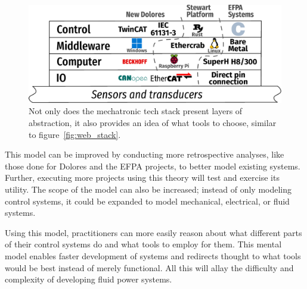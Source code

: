 \documentclass[english,12pt,a4paper,pdftex,eng,utf8]{aaltothesis}
\begin{document}
\begin{figure}[h]
  \centering
  \includegraphics[width=\textwidth]{assets/mechatronic_tech_stack_filled}
  \caption{Not only does the mechatronic tech stack present layers of abstraction, it also provides an idea of what tools to choose, similar to figure~\ref{fig:web_stack}.}\label{fig:mechatronic_tech_stack_filled}
\end{figure}

This model can be improved by conducting more retrospective analyses, like those done for Dolores and the EFPA projects, to better model existing systems. Further, executing more projects using this theory will test and exercise its utility. The scope of the model can also be increased; instead of only modeling control systems, it could be expanded to model mechanical, electrical, or fluid systems.

Using this model, practitioners can more easily reason about what different parts of their control systems do and what tools to employ for them. This mental model enables faster development of systems and redirects thought to what tools would be best instead of merely functional. All this will allay the difficulty and complexity of developing fluid power systems.

\clearpage

{}



\end{document}
